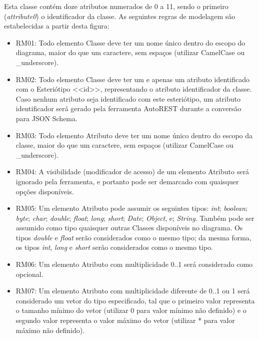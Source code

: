 Esta classe contém doze atributos numerados de 0 a 11, sendo o primeiro (\textit{attribute0}) o identificador da classe. As seguintes regras de modelagem são estabelecidas a partir desta figura:

\begin{itemize}
    \item RM01: Todo elemento Classe deve ter um nome único dentro do escopo do diagrama, maior do que um caractere, sem espaços (utilizar CamelCase ou \_underscore).

    \item RM02: Todo elemento Classe deve ter um e apenas um atributo identificado com o Esteriótipo <<id>>, representando o atributo identificador da classe. Caso nenhum atributo seja identificado com este esteriótipo, um atributo identificador será gerado pela ferramenta AutoREST durante a conversão para JSON Schema.

    \item RM03: Todo elemento Atributo deve ter um nome único dentro do escopo da classe, maior do que um caractere, sem espaços (utilizar CamelCase ou \_underscore).

    \item RM04: A visibilidade (modificador de acesso) de um elemento Atributo será ignorado pela ferramenta, e portanto pode ser demarcado com quaisquer opções disponíveis.

    \item RM05: Um elemento Atributo pode assumir os seguintes tipos: \textit{int}; \textit{boolean}; \textit{byte}; \textit{char}; \textit{double}; \textit{float}; \textit{long}; \textit{short}; \textit{Date}; \textit{Object}, e; \textit{String}. Também pode ser assumido como tipo quaisquer outras Classes disponíveis no diagrama. Os tipos \textit{double} e \textit{float} serão considerados como o mesmo tipo; da mesma forma, os tipos \textit{int}, \textit{long} e \textit{short} serão considerados como o mesmo tipo.

    \item RM06: Um elemento Atributo com multiplicidade 0..1 será considerado como opcional.

    \item RM07: Um elemento Atributo com multiplicidade diferente de 0..1 ou 1 será considerado um vetor do tipo especificado, tal que o primeiro valor representa o tamanho mínimo do vetor (utilizar 0 para valor mínimo não definido) e o segundo valor representa o valor máximo do vetor (utilizar * para valor máximo não definido).
\end{itemize}

